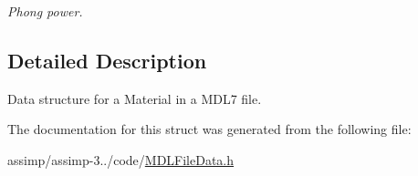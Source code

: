 \begin{DoxyCompactItemize}
\begin{DoxyCompactList}\small\item\em Phong power. \end{DoxyCompactList}\end{DoxyCompactItemize}


\subsection{Detailed Description}
Data structure for a Material in a M\+D\+L7 file. 

The documentation for this struct was generated from the following file\+:\begin{DoxyCompactItemize}
\item 
assimp/assimp-\/3../code/\hyperlink{_m_d_l_file_data_8h}{M\+D\+L\+File\+Data.\+h}\end{DoxyCompactItemize}
